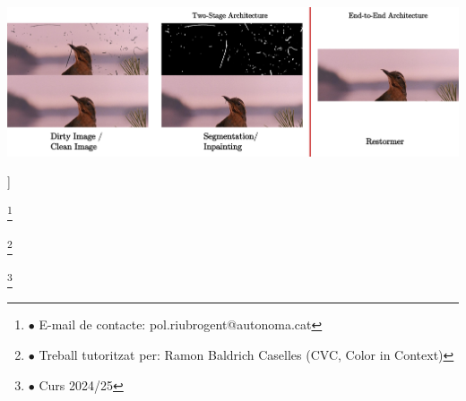 \documentclass[10pt,a4paper,twocolumn,twoside]{article}
\newcommand\blfootnote[1]{%
  \begingroup
  \renewcommand\thefootnote{}\footnote{#1}%
  \addtocounter{footnote}{-1}%
  \endgroup
}
\begin{document}
\begin{@twocolumnfalse}
\begin{center}
\end{center}

\bigskip


{
    \centering
    \includegraphics[width= \textwidth]{img/Portada.pdf}
    \label{fig:portada}
}

\end{@twocolumnfalse}]

\blfootnote{$\bullet$ E-mail de contacte: pol.riubrogent@autonoma.cat}
\blfootnote{$\bullet$ Treball tutoritzat per: Ramon Baldrich Caselles (CVC, Color in Context)} \blfootnote{$\bullet$ Curs 2024/25}
\end{document}
